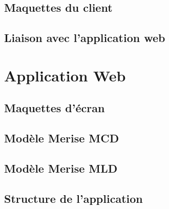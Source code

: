 \documentclass[a4paper]{article}
\begin{document}
    \subsection{Maquettes du client}
        
    \subsection{Liaison avec l'application web}
        
        
\newpage

\section{Application Web}

    \subsection{Maquettes d'écran}
        
\newpage

    \subsection{Modèle Merise MCD}
        
\newpage

    \subsection{Modèle Merise MLD}
        
\newpage

    \subsection{Structure de l'application}
        

\newpage
\tableofcontents
\end{document}
